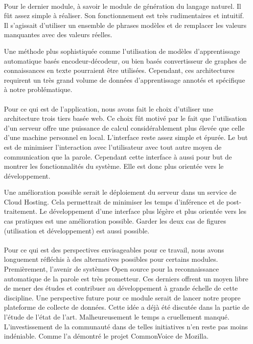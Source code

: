 \paragraph{}
Pour le dernier module, à savoir le module de génération du langage naturel. Il fût assez simple à réaliser. Son fonctionnement est très rudimentaires et intuitif. Il s'agissait d'utiliser un ensemble de phrases modèles et de remplacer les valeurs manquantes avec des valeurs réelles.


Une méthode plus sophistiquée comme l'utilisation de modèles d'apprentissage automatique basés encodeur-décodeur, ou bien basés convertisseur de graphes de connaissances en texte pourraient être utilisées. Cependant, ces architectures requirent un très grand volume de données d'apprentissage annotés et spécifique à notre problématique.

\paragraph{}
Pour ce qui est de l'application, nous avons fait le choix d'utiliser une architecture trois tiers basée web. Ce choix fût motivé par le fait que l'utilisation d'un serveur offre une puissance de calcul considérablement plus élevée que celle d'une machine personnel en local. L'interface reste assez simple et épurée. Le but est de minimiser l'interaction avec l'utilisateur avec tout autre moyen de communication que la parole. Cependant cette interface à aussi pour but de montrer les fonctionnalités du système. Elle est donc plus orientée vers le développement.


Une amélioration possible serait le déploiement du serveur dans un service de Cloud Hosting. Cela permettrait de minimiser les temps d'inférence et de post-traitement. Le développement d'une interface plus légère et plus orientée vers les cas pratiques est une amélioration possible. Garder les deux cas de figures (utilisation et développement) est aussi possible.

\paragraph{}
Pour ce qui est des perspectives envisageables pour ce travail, nous avons longuement réfléchis à des alternatives possibles pour certains modules. Premièrement, l'avenir de systèmes Open source pour la reconnaissance automatique de la parole est très prometteur. Ces derniers offrent un moyen libre de mener des études et contribuer au développement à grande échelle de cette discipline. Une perspective future pour ce module serait de lancer notre propre plateforme de collecte de données. Cette idée a déjà été discutée dans la partie de l'étude de l'état de l'art. Malheureusement le temps a cruellement manqué. L'investissement de la communauté dans de telles initiatives n'en reste pas moins indéniable. Comme l'a démontré le projet CommonVoice de Mozilla.


